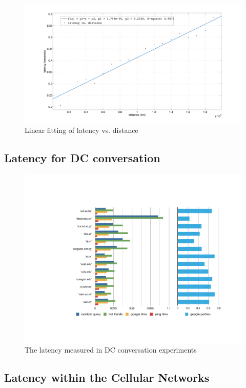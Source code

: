 \begin{figure}
  \centering
  \includegraphics[width=\linewidth]{../figs/fit_curve.pdf}
  \caption{Linear fitting of latency vs. distance}
  \label{fig:fit_curve}
\end{figure}

\subsection{Latency for DC conversation}
\label{sec:latency-dc-conv-1}

\begin{figure}
  \centering
  \includegraphics[width=\linewidth]{../figs/data_center.pdf}
  \caption{The latency measured in DC conversation experiments}
  \label{fig:data_center}
\end{figure}

\subsection{Latency within the Cellular Networks}
\label{sec:latency-with-cell}

